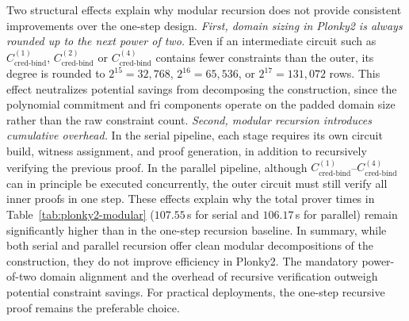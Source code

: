 Two structural effects explain why modular recursion does not provide consistent improvements over the one-step design.
\emph{First, domain sizing in Plonky2 is always rounded up to the next power of two.} Even if an intermediate circuit such as $C_{\text{cred-bind}}^{(1)}$, $C_{\text{cred-bind}}^{(2)}$ or $C_{\text{cred-bind}}^{(4)}$ contains fewer constraints than the outer, its degree is rounded to $2^{15}=32{,}768$, $2^{16}=65{,}536$, or $2^{17}=131{,}072$ rows. This effect neutralizes potential savings from decomposing the construction, since the polynomial commitment and \acrshort{fri} components operate on the padded domain size rather than the raw constraint count.
\emph{Second, modular recursion introduces cumulative overhead.} In the serial pipeline, each stage requires its own circuit build, witness assignment, and proof generation, in addition to recursively verifying the previous proof. In the parallel pipeline, although $C_{\text{cred-bind}}^{(1)}$--$C_{\text{cred-bind}}^{(4)}$ can in principle be executed concurrently, the outer circuit must still verify all inner proofs in one step. These effects explain why the total prover times in Table~\ref{tab:plonky2-modular} ($107.55$\,s for serial and $106.17$\,s for parallel) remain significantly higher than in the one-step recursion baseline. In summary, while both serial and parallel recursion offer clean modular decompositions of the construction, they do not improve efficiency in Plonky2. The mandatory power-of-two domain alignment and the overhead of recursive verification outweigh potential constraint savings. For practical deployments, the one-step recursive proof remains the preferable choice.


